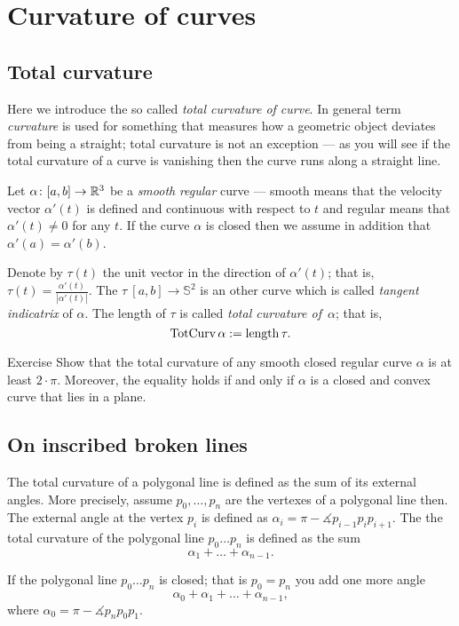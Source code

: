\chapter{Curvature of curves}

\section{Total curvature}

Here we introduce the so called \emph{total curvature of curve}.
In general term \emph{curvature} is used for something that measures how 
a geometric object deviates from being a straight;
total curvature is not an exception --- as you will see if the total curvature of a curve is vanishing then the curve runs along a straight line.


Let $\alpha\colon[a,b]\to\mathbb{R}^3$ be a \emph{smooth} \emph{regular} curve --- smooth means that
the velocity vector $\alpha'(t)$ is defined and continuous with respect to $t$ and regular means that $\alpha'(t)\ne 0$ for any $t$.
If the curve $\alpha$ is closed then we assume in addition that $\alpha'(a)=\alpha'(b)$.

Denote by $\tau(t)$ the unit vector in the direction of $\alpha'(t)$;
that is, $\tau(t)=\tfrac{\alpha'(t)}{|\alpha'(t)|}$.
The $\tau\:[a,b]\to\mathbb{S}^2$ is an other curve which is called \emph{tangent indicatrix} of $\alpha$.
The length of $\tau$ is called \emph{total curvature of}~$\alpha$;
that is,
\[\mathop{\rm TotCurv}\nolimits\alpha:=\mathop{\rm length}\nolimits\tau.\]

\begin{thm}{Exercise}
Show that the total curvature of any smooth closed regular curve $\alpha$ is at least $2\cdot\pi$.
Moreover, the equality holds if and only if $\alpha$ is a closed and convex curve that lies in a plane.
\end{thm}

\section{On inscribed broken lines}

The total curvature of a polygonal line is defined as the sum of its external angles.
More precisely, assume $p_0,\dots,p_n$ are the vertexes of a polygonal line then.
The external angle at the vertex $p_i$ is defined as $\alpha_i=\pi-\measuredangle p_{i-1}p_ip_{i+1}$.
The the total curvature of the polygonal line $p_0\dots p_n$ is defined as the sum
\[\alpha_1+\dots+\alpha_{n-1}.\]

If the polygonal line $p_0\dots p_n$ is closed; that is $p_0=p_n$ you add one more angle 
\[\alpha_0+\alpha_1+\dots+\alpha_{n-1},\]
where $\alpha_0=\pi-\measuredangle p_{n}p_0p_{1}$.

